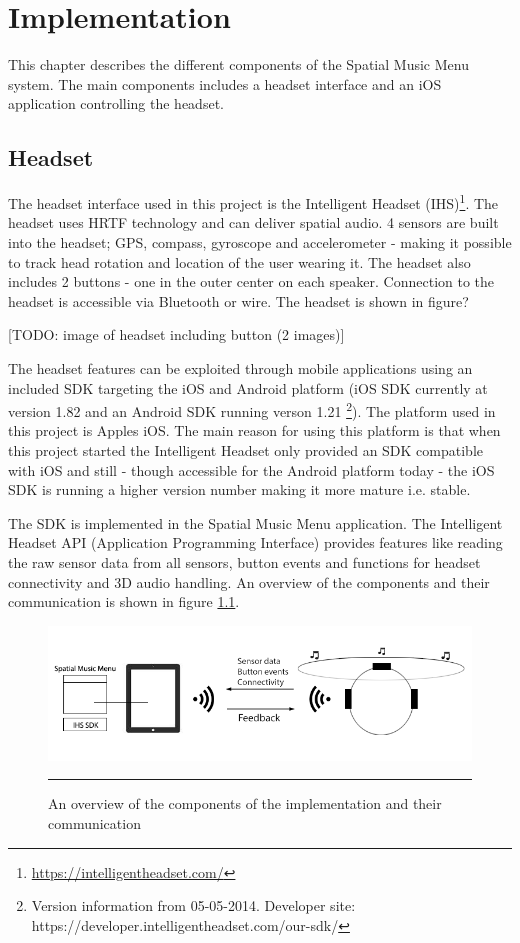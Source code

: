 \chapter{Implementation}
This chapter describes the different components of the Spatial Music Menu system. The main components includes a headset interface and an iOS application controlling the headset.

\section{Headset}
The headset interface used in this project is the Intelligent Headset (IHS)\footnote{\url{https://intelligentheadset.com/}}. The headset uses HRTF technology and can deliver spatial audio. 4 sensors are built into the headset; GPS, compass, gyroscope and accelerometer - making it possible to track head rotation and location of the user wearing it. The headset also includes 2 buttons - one in the outer center on each speaker. Connection to the headset is accessible via Bluetooth or wire. The headset is shown in figure?

[TODO: image of headset including button (2 images)]

The headset features can be exploited through mobile applications using an included SDK targeting the iOS and Android platform (iOS SDK currently at version 1.82 and an Android SDK running verson 1.21 \footnote{Version information from 05-05-2014. Developer site: https://developer.intelligentheadset.com/our-sdk/}). The platform used in this project is Apples iOS. The main reason for using this platform is that when this project started the Intelligent Headset only provided an SDK compatible with iOS and still - though accessible for the Android platform today - the iOS SDK is running a higher version number making it more mature i.e. stable.

The SDK is implemented in the Spatial Music Menu application. The Intelligent Headset API (Application Programming Interface) provides features like reading the raw sensor data from all sensors, button events and functions for headset connectivity and 3D audio handling. An overview of the components and their communication is shown in figure \ref{fig:implementationoverview}.

\begin{figure}[htbp]
	\centering
		\includegraphics[width=\textwidth,height=\textheight,keepaspectratio]{./Figures/implementation_overview.png}
		\rule{35em}{1pt}
	\caption[Implementation overview]{An overview of the components of the implementation and their communication}
	\label{fig:implementationoverview}
\end{figure}

